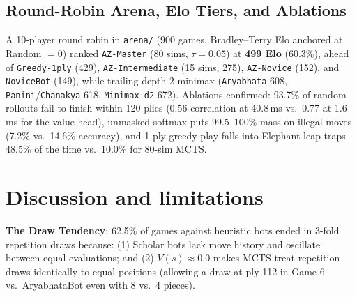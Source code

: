 \documentclass[11pt,a4paper,twocolumn]{article}
\begin{document}
\begin{table}[h]
\centering
\small
{}
\caption{Tournament benchmark against heuristic Scholar Bots.}
\label{tab:tourney}
\end{table}

\subsection{Round-Robin Arena, Elo Tiers, and Ablations}
A 10-player round robin in \texttt{arena/} (900 games, Bradley--Terry Elo anchored at Random $= 0$) ranked \texttt{AZ-Master} (80 sims, $\tau{=}0.05$) at \textbf{499 Elo} (60.3\%), ahead of \texttt{Greedy-1ply} (429), \texttt{AZ-Intermediate} (15 sims, 275), \texttt{AZ-Novice} (152), and \texttt{NoviceBot} (149), while trailing depth-2 minimax (\texttt{Aryabhata} 608, \texttt{Panini}/\texttt{Chanakya} 618, \texttt{Minimax-d2} 672). Ablations confirmed: 93.7\% of random rollouts fail to finish within 120 plies (0.56 correlation at 40.8\,ms vs.\ 0.77 at 1.6\,ms for the value head), unmasked softmax puts 99.5--100\% mass on illegal moves (7.2\% vs.\ 14.6\% accuracy), and 1-ply greedy play falls into Elephant-leap traps 48.5\% of the time vs.\ 10.0\% for 80-sim MCTS.

\section{Discussion and limitations}
\textbf{The Draw Tendency}: 62.5\% of games against heuristic bots ended in 3-fold repetition draws because: (1) Scholar bots lack move history and oscillate between equal evaluations; and (2) $V(s) \approx 0.0$ makes MCTS treat repetition draws identically to equal positions (allowing a draw at ply 112 in Game 6 vs.\ AryabhataBot even with 8 vs.\ 4 pieces).
\end{document}
